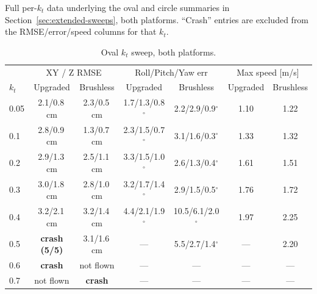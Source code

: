 \documentclass[11pt,a4paper]{article}
\begin{document}
Full per-$k_t$ data underlying the oval and circle summaries in
Section~\ref{sec:extended-sweeps}, both platforms. ``Crash'' entries are excluded from the
RMSE/error/speed columns for that $k_t$.

\begin{table}[h]
\centering
\scriptsize
\renewcommand{\arraystretch}{1.15}
\begin{tabular}{@{}lcccccc@{}}
\toprule
& \multicolumn{2}{c}{XY / Z RMSE} & \multicolumn{2}{c}{Roll/Pitch/Yaw err} & \multicolumn{2}{c}{Max speed [m/s]} \\
\cmidrule(lr){2-3} \cmidrule(lr){4-5} \cmidrule(lr){6-7}
$k_t$ & Upgraded & Brushless & Upgraded & Brushless & Upgraded & Brushless \\
\midrule
0.05 & 2.1/0.8\,cm & 2.3/0.5\,cm & 1.7/1.3/0.8$^\circ$ & 2.2/2.9/0.9$^\circ$ & 1.10 & 1.22 \\
0.1  & 2.8/0.9\,cm & 1.3/0.7\,cm & 2.3/1.5/0.7$^\circ$ & 3.1/1.6/0.3$^\circ$ & 1.33 & 1.32 \\
0.2  & 2.9/1.3\,cm & 2.5/1.1\,cm & 3.3/1.5/1.0$^\circ$ & 2.6/1.3/0.4$^\circ$ & 1.61 & 1.51 \\
0.3  & 3.0/1.8\,cm & 2.8/1.0\,cm & 3.2/1.7/1.4$^\circ$ & 2.9/1.5/0.5$^\circ$ & 1.76 & 1.72 \\
0.4  & 3.2/2.1\,cm & 3.2/1.4\,cm & 4.4/2.1/1.9$^\circ$ & 10.5/6.1/2.0$^\circ$ & 1.97 & 2.25 \\
0.5  & \textbf{crash (5/5)} & 3.1/1.6\,cm & --- & 5.5/2.7/1.4$^\circ$ & --- & 2.20 \\
0.6  & \textbf{crash} & not flown & --- & --- & --- & --- \\
0.7  & not flown & \textbf{crash} & --- & --- & --- & --- \\
\bottomrule
\end{tabular}
\caption{Oval $k_t$ sweep, both platforms.}
\label{tab:oval-ktsweep}
\end{table}
\end{document}

